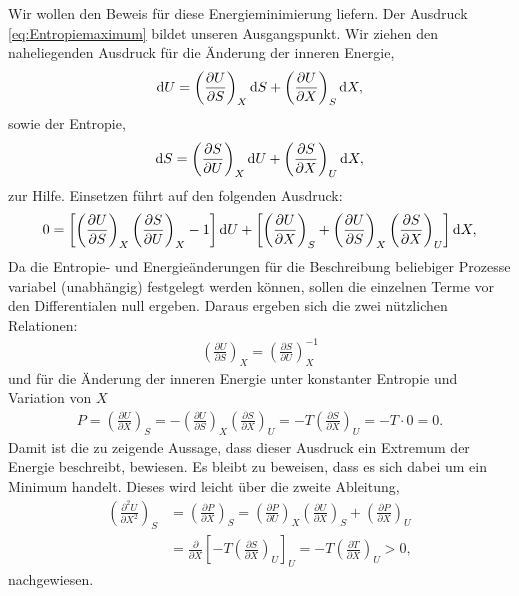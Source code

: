 Wir wollen den Beweis für diese Energieminimierung liefern.
Der Ausdruck \ref{eq:Entropiemaximum} bildet unseren Ausgangspunkt. Wir ziehen den naheliegenden Ausdruck für die Änderung der inneren Energie, 
\begin{align*}
    \mathop{}\!\mathrm{d} U=\left( \frac{\partial U}{\partial S}  \right)_X \mathop{}\!\mathrm{d} S + \left( \frac{\partial U}{\partial X}  \right)_S \mathop{}\!\mathrm{d} X,
\end{align*}
sowie der Entropie,
\begin{align*}
    \mathop{}\!\mathrm{d} S=\left( \frac{\partial S}{\partial U}  \right)_X \mathop{}\!\mathrm{d} U + \left( \frac{\partial S}{\partial X}  \right)_U \mathop{}\!\mathrm{d} X,
\end{align*}
zur Hilfe.
Einsetzen führt auf den folgenden Ausdruck:
\begin{align*}
    0=\left[\left( \frac{\partial U}{\partial S}  \right)_X\left( \frac{\partial S}{\partial U}  \right)_X -1\right]\mathop{}\!\mathrm{d} U + \left[\left( \frac{\partial U}{\partial X}  \right)_S+\left( \frac{\partial U}{\partial S}  \right)_X\left( \frac{\partial S}{\partial X}  \right)_U \right]\mathop{}\!\mathrm{d} X,
\end{align*}
Da die Entropie- und Energieänderungen für die Beschreibung beliebiger Prozesse variabel (unabhängig) festgelegt werden können, sollen die einzelnen Terme vor den Differentialen null ergeben.
Daraus ergeben sich die zwei nützlichen Relationen:
\begin{align*}
    \left( \frac{\partial U}{\partial S}  \right)_X=\left( \frac{\partial S}{\partial U}  \right)_X^{-1}
\end{align*}
und für die Änderung der inneren Energie unter konstanter Entropie und Variation von $X$
\begin{align*}
    P=\left( \frac{\partial U}{\partial X}  \right)_S=-\left( \frac{\partial U}{\partial S}  \right)_X\left( \frac{\partial S}{\partial X}  \right)_U=-T\left( \frac{\partial S}{\partial X}  \right)_U=-T\cdot0=0.
\end{align*}
Damit ist die zu zeigende Aussage, dass dieser Ausdruck ein Extremum der Energie beschreibt, bewiesen.
Es bleibt zu beweisen, dass es sich dabei um ein Minimum handelt.
Dieses wird leicht über die zweite Ableitung,
\begin{align*}
    \left( \frac{\partial ^2U}{\partial X^2}  \right)_S&=\left( \frac{\partial P}{\partial X}  \right)_S=\left( \frac{\partial P}{\partial U}  \right)_X\left( \frac{\partial U}{\partial X}  \right)_S+\left( \frac{\partial P}{\partial X}  \right)_U\\
    &=\frac{\partial}{\partial X}\left[-T\left( \frac{\partial S}{\partial X}  \right)_U\right]_U =-T\left( \frac{\partial T}{\partial X}  \right)_U>0,
\end{align*}
nachgewiesen.

